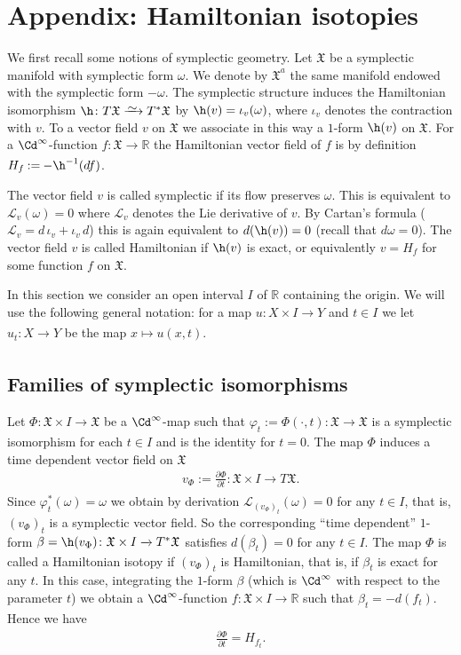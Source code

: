 \documentclass[12pt,leqno]{article}
\theoremstyle{definition}
\newcommand{\R}{{\mathbb{R}}}
\def\phi{{\varphi}}
\def\shl{\mathscr{L}}
\newcommand{\symx}{{\mathfrak{X}}}
\renewcommand{\to}[1][]{\xrightarrow[]{#1}}
\newcommand{\isoto}[1][]{\xrightarrow[#1]%
{{\raisebox{-.6ex}[0ex][-.6ex]{$\mspace{1mu}\sim\mspace{2mu}$}}}}
\newcommand{\eqdot}{\mathbin{:=}}
\newcommand{\cl}{\colon}
\newcommand{\eq}{\begin{eqnarray}}
\newcommand{\eneq}{\end{eqnarray}}
\numberwithin{equation}{section}
\begin{document}
\appendix

\section{Appendix: Hamiltonian isotopies}
\label{sec:Hisot}

We first recall some notions of symplectic geometry. Let $\symx$ be a
symplectic manifold with symplectic form $\omega$. We denote by $\symx^a$ the
same manifold endowed with the symplectic form $-\omega$.  The symplectic
structure induces the Hamiltonian isomorphism $\h\cl T\symx \isoto T^*\symx$
by $\h(v) = \iota_v(\omega)$, where $\iota_v$ denotes the
contraction with $v$.
To a vector field $v$ on $\symx$ we associate in this way a $1$-form
$\h(v)$ on $\symx$.  For a $\Cd^\infty$-function
$f\cl \symx\to \R$ the Hamiltonian vector field of $f$ is by definition
$H_f \eqdot -\h^{-1}(df)$.

The vector field $v$ is called symplectic if its flow preserves $\omega$.
This is equivalent to $\shl_v(\omega) = 0$ where $\shl_v$ denotes
the Lie derivative of $v$.  By Cartan's formula
($\shl_v= d\,\iota_v+ \iota_v\,d$) this is again equivalent
to $d(\h(v)) = 0$ (recall that $d\omega=0$).  The vector field $v$ is
called Hamiltonian if $\h(v)$ is exact, or equivalently
$v=H_f$ for some function $f$ on $\symx$.

In this section we consider an open interval $I$ of $\R$ containing the
origin. We will use the following general notation: for a map
$u\cl X\times I \to Y$ and $t\in I$ we let $u_t\cl X\to Y$ be the map
$x\mapsto u(x,t)$.

\subsection{Families of symplectic isomorphisms}\label{app:symp}
Let $\Phi\cl \symx \times I\to \symx$ be a $\Cd^\infty$-map such that
$\phi_t\eqdot\Phi(\cdot,t)\cl \symx \to \symx$ is a symplectic isomorphism for
each $t\in I$ and is the identity for $t=0$. The map $\Phi$ induces a time
dependent vector field on $\symx$
\eq
&& v_\Phi \eqdot \frac{\partial\Phi}{\partial t} \cl \symx\times I\to T\symx.
\eneq 
Since $\phi_t^*(\omega) =\omega$ we obtain by derivation
$\shl_{(v_\Phi)_t} (\omega)= 0$ for any $t\in I$, that is, $(v_\Phi)_t$ is a
symplectic vector field.  So the corresponding ``time dependent'' $1$-form
$\beta =\h(v_\Phi) \cl \symx\times I\to T^*\symx$ satisfies $d(\beta_t) =0$
for any $t\in I$.  The map $\Phi$ is called a Hamiltonian isotopy if
$(v_\Phi)_t$ is Hamiltonian, that is, if $\beta_t$ is exact for any $t$. 
In this case, integrating the $1$-form $\beta$ (which is $\Cd^\infty$ with
respect to the parameter $t$) we obtain a $\Cd^\infty$-function
$f\cl \symx \times I\to\R$ such that $\beta_t =- d(f_t)$.
Hence we have
\eq\label{def:f}
&&\frac{\partial\Phi}{\partial t} =H_{f_t}.
\eneq
\end{document}
